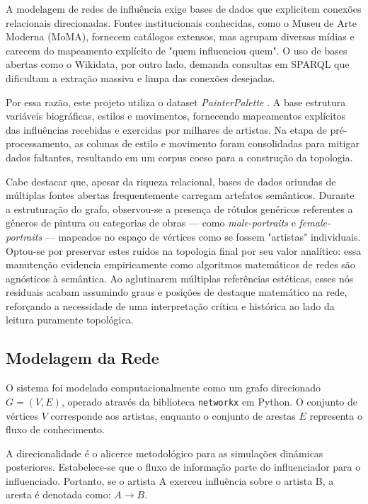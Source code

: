 \documentclass[12pt,a4paper]{article}
\begin{document}
A modelagem de redes de influência exige bases de dados que explicitem conexões relacionais direcionadas. Fontes institucionais conhecidas, como o Museu de Arte Moderna (MoMA), fornecem catálogos extensos, mas agrupam diversas mídias e carecem do mapeamento explícito de "quem influenciou quem". O uso de bases abertas como o Wikidata, por outro lado, demanda consultas em SPARQL que dificultam a extração massiva e limpa das conexões desejadas.

Por essa razão, este projeto utiliza o dataset \textit{PainterPalette} \cite{painterpalette_ref}. A base estrutura variáveis biográficas, estilos e movimentos, fornecendo mapeamentos explícitos das influências recebidas e exercidas por milhares de artistas. Na etapa de pré-processamento, as colunas de estilo e movimento foram consolidadas para mitigar dados faltantes, resultando em um corpus coeso para a construção da topologia.

Cabe destacar que, apesar da riqueza relacional, bases de dados oriundas de múltiplas fontes abertas frequentemente carregam artefatos semânticos. Durante a estruturação do grafo, observou-se a presença de rótulos genéricos referentes a gêneros de pintura ou categorias de obras — como \textit{male-portraits} e \textit{female-portraits} — mapeados no espaço de vértices como se fossem "artistas" individuais. Optou-se por preservar estes ruídos na topologia final por seu valor analítico: essa manutenção evidencia empiricamente como algoritmos matemáticos de redes são agnósticos à semântica. Ao aglutinarem múltiplas referências estéticas, esses nós residuais acabam assumindo graus e posições de destaque matemático na rede, reforçando a necessidade de uma interpretação crítica e histórica ao lado da leitura puramente topológica.

\subsection{Modelagem da Rede}

O sistema foi modelado computacionalmente como um grafo direcionado $G = (V, E)$, operado através da biblioteca \texttt{networkx} em Python. O conjunto de vértices $V$ corresponde aos artistas, enquanto o conjunto de arestas $E$ representa o fluxo de conhecimento.

A direcionalidade é o alicerce metodológico para as simulações dinâmicas posteriores. Estabelece-se que o fluxo de informação parte do influenciador para o influenciado. Portanto, se o artista A exerceu influência sobre o artista B, a aresta é denotada como:
$A \rightarrow B$.
\end{document}
